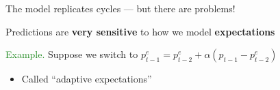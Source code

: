 \documentclass[
    xcolor={svgnames,dvipsnames},
    hyperref={colorlinks, citecolor=DeepPink4, linkcolor=DarkRed, urlcolor=DarkBlue}
    ]{beamer}  %
\newcommand{\Eg}{\textcolor{ForestGreen}{Example. }}
\newcommand{\emp}[1]{\textcolor{DarkOrange1}{\bf #1}}
\newcommand{\1}{\mathbbm 1}
\begin{document}
\begin{frame}
    
    The model replicates cycles --- but there are problems!

    \vspace{1em}
    \vspace{1em}
    Predictions are \emp{very sensitive} to how we model \emp{expectations}

    \vspace{1em}
    \vspace{1em}
    \vspace{1em}
    \Eg Suppose we switch to $p_{t-1}^e = p^e_{t-2} + \alpha (p_{t-1} - p^e_{t-2}) $ 

    \vspace{1em}
    \vspace{1em}
    \begin{itemize}
        \item Called ``adaptive expectations''
    \end{itemize}

\end{frame}


\begin{frame}
    
    \begin{figure}
        \centering
    \end{figure}

\end{frame}
\end{document}
